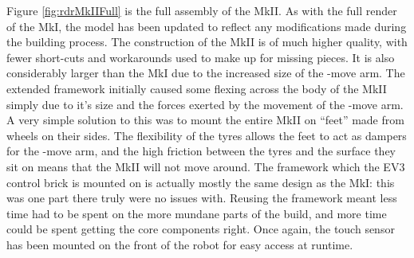 \documentclass{report}
\newcommand{\move}[1]{\uppercase{\texttt{\formatmovesnospace{#1}}}-move}
\begin{document}
    Figure \ref{fig:rdrMkIIFull} is the full assembly of the MkII. As with the full render of the MkI, the model has been updated to reflect any modifications made during the building process. The construction of the MkII is of much higher quality, with fewer short-cuts and workarounds used to make up for missing pieces. It is also considerably larger than the MkI due to the increased size of the \move{x} arm. The extended framework initially caused some flexing across the body of the MkII simply due to it's size and the forces exerted by the movement of the \move{x} arm. A very simple solution to this was to mount the entire MkII on \enquote{feet} made from wheels on their sides. The flexibility of the tyres allows the feet to act as dampers for the \move{x} arm, and the high friction between the tyres and the surface they sit on means that the MkII will not move around. The framework which the EV3 control brick is mounted on is actually mostly the same design as the MkI: this was one part there truly were no issues with. Reusing the framework meant less time had to be spent on the more mundane parts of the build, and more time could be spent getting the core components right. Once again, the touch sensor has been mounted on the front of the robot for easy access at runtime.
    
\end{document}
